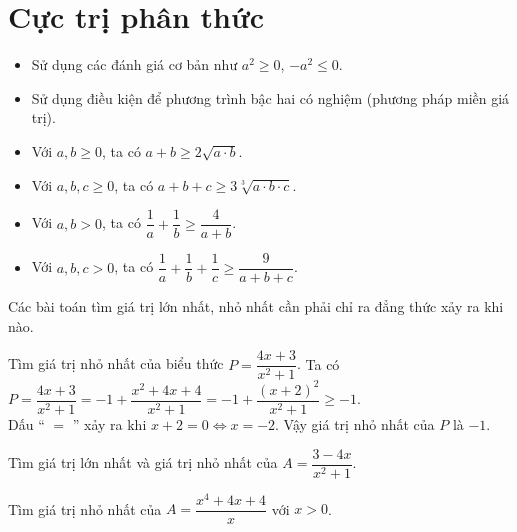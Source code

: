 
\section{Cực trị phân thức}


\begin{tcolorbox}
	\begin{itemize}
		\item Sử dụng các đánh giá cơ bản như $a^2\geq 0$, $-a^2\leq 0$. 
		\item Sử dụng điều kiện để phương trình bậc hai có nghiệm (phương pháp miền giá trị).
		\item Với $a,b \geq 0$, ta có $a+b\geq 2\sqrt{a\cdot b}$.
		\item Với $a,b,c \geq 0$, ta có $a+b+c\geq 3\sqrt[3]{a\cdot b\cdot c}$.
		\item Với $a,b>0$, ta có $\dfrac{1}{a}+\dfrac{1}{b}\geq\dfrac{4}{a+b}$.
		\item Với $a,b,c > 0$, ta có $\dfrac{1}{a}+\dfrac{1}{b} +\dfrac{1}{c}\geq \dfrac{9}{a+b+c}$.
	\end{itemize}
\begin{note}
	Các bài toán tìm giá trị lớn nhất, nhỏ nhất cần phải chỉ ra đẳng thức xảy ra khi nào.
\end{note}
\end{tcolorbox}

\begin{bt} Tìm giá trị nhỏ nhất của biểu thức $P=\dfrac{4x+3}{x^2+1}$.
	\loigiai
	{ Ta có $P=\dfrac{4x+3}{x^2+1}=-1+\dfrac{x^2+4x+4}{x^2+1} =-1 +\dfrac{(x+2)^2}{x^2+1} \geq -1$.\\
		Dấu `` $=$ '' xảy ra khi $x+2=0 \Leftrightarrow x=-2$. Vậy giá trị nhỏ nhất của $P$ là $-1$.
	}
\end{bt}

\begin{bt}
	Tìm giá trị lớn nhất và giá trị nhỏ nhất của $A=\dfrac{3-4x}{x^2+1}$.
\end{bt}

\begin{bt}
	Tìm giá trị nhỏ nhất của $A=\dfrac{x^4+4x+4}{x}$ với $x>0$.
\end{bt}

